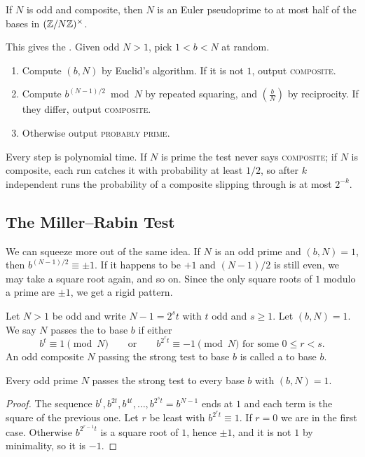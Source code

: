\documentclass[a4paper]{scrartcl}
\begin{document}
\begin{corollary}
	If $N$ is odd and composite, then $N$ is an Euler pseudoprime to at most half of the bases in $(\mathbb{Z}/N\mathbb{Z})^\times$.
\end{corollary}

This gives the . Given odd $N > 1$, pick $1 < b < N$ at random.
\begin{enumerate}[label=(\arabic*)]
	\item Compute $(b, N)$ by Euclid's algorithm. If it is not $1$, output \textsc{composite}.
	\item Compute $b^{(N-1)/2}\bmod N$ by repeated squaring, and $\left( \frac bN\right)$ by reciprocity. If they differ, output \textsc{composite}.
	\item Otherwise output \textsc{probably prime}.
\end{enumerate}
Every step is polynomial time. If $N$ is prime the test never says \textsc{composite}; if $N$ is composite, each run catches it with probability at least $1/2$, so after $k$ independent runs the probability of a composite slipping through is at most $2^{-k}$.

\subsection{The Miller--Rabin Test}

We can squeeze more out of the same idea. If $N$ is an odd prime and $(b, N) = 1$, then $b^{(N-1)/2}\equiv\pm1$. If it happens to be $+1$ and $(N-1)/2$ is still even, we may take a square root again, and so on. Since the only square roots of $1$ modulo a prime are $\pm1$, we get a rigid pattern.

\begin{definition}
	Let $N > 1$ be odd and write $N - 1 = 2^st$ with $t$ odd and $s \geq 1$. Let $(b, N) = 1$. We say $N$ passes the  to base $b$ if either
	$$
	b^t \equiv 1 \pmod N \qquad \text{or} \qquad b^{2^rt}\equiv-1\pmod N \text{ for some } 0 \leq r < s.
	$$
	An odd composite $N$ passing the strong test to base $b$ is called a  to base $b$.
\end{definition}

\begin{proposition}
	Every odd prime $N$ passes the strong test to every base $b$ with $(b,N) = 1$.
\end{proposition}
\begin{proof}
	The sequence $b^t, b^{2t}, b^{4t}, \dots, b^{2^st} = b^{N-1}$ ends at $1$ and each term is the square of the previous one. Let $r$ be least with $b^{2^rt} \equiv 1$. If $r = 0$ we are in the first case. Otherwise $b^{2^{r-1}t}$ is a square root of $1$, hence $\pm1$, and it is not $1$ by minimality, so it is $-1$.
\end{proof}
\end{document}
